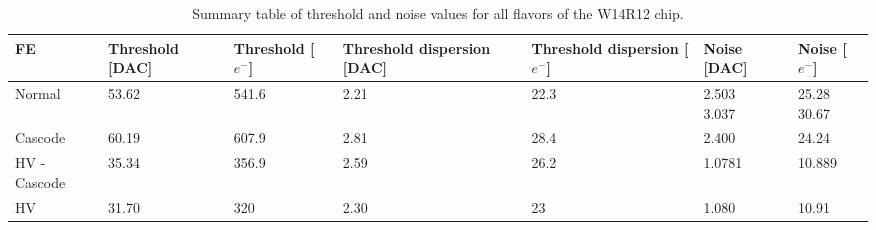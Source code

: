 \begin{comment}
\begin{table}[h!]
\centering
\begin{tabular}{C{1.3cm}|C{1.7cm}|C{1.6cm}|C{1.8cm}|C{1.6cm}|C{1.8cm}|C{1.9cm}}
\hline
FE & Threshold [DAC] & Threshold [$e^{-}$] & Threshold dispersion [DAC] & Threshold dispersion [$e^{-}$] & Noise [DAC] & Noise [$e^{-}$]\\
\hline
\hline
Normal  & 53.62$\pm$0.01 & 541.6$\pm$0.1  & 2.21$\pm$0.01 & 22.3$\pm$0.1 & \shortstack{2.503$\pm$0.005 \\ 3.037$\pm$0.002} & \shortstack{25.28$\pm$0.05 \\ 30.67$\pm$0.02}\\
\hline
Cascode & 60.19$\pm$0.01 & 607.9$\pm$0.1 & 2.81$\pm$0.01 & 28.4$\pm$0.1 & 2.400$\pm$0.003 & 24.24$\pm$0.03\\
\hline
HV - Cascode & 35.34$\pm$0.05 & 356.9$\pm$0.5 & 2.59$\pm$0.05 & 53.4$\pm$0.5 & 1.0781$\pm$0.0003 & 10.889$\pm$0.003\\
\hline
HV & 31.70$\pm$0.10 & 320$\pm$1 & 2.30$\pm$0.10 & 23$\pm$1 & 1.080$\pm$0.033 & 10.91$\pm$0.33\\
\hline
\end{tabular}
\caption{Summary table of threshold and noise values for all flavors of the W14R12 chip.}
\label{tab:th_noise_all}
\end{table}
\end{comment}

\begin{table}[h!]
\centering
\begin{tabular}{C{1.3cm}|C{1.7cm}|C{1.6cm}|C{1.8cm}|C{1.6cm}|C{1.8cm}|C{1.9cm}}
\hline
FE & Threshold [DAC] & Threshold [$e^{-}$] & Threshold dispersion [DAC] & Threshold dispersion [$e^{-}$] & Noise [DAC] & Noise [$e^{-}$]\\
\hline
\hline
Normal  & 53.62 & 541.6  & 2.21 & 22.3 &  & \\
\hline
Cascode & 60.19 & 607.9 & 2.81 & 28.4 & 2.400 & 24.24\\
\hline
HV - Cascode & 35.34 & 356.9 & 2.59 & 26.2 & 1.0781 & 10.889\\
\hline
HV & 31.70 & 320 & 2.30 & 23 & 1.080 & 10.91\\
\hline
\end{tabular}
\caption{Summary table of threshold and noise values for all flavors of the W14R12 chip.}
\label{tab:th_noise_all}
\end{table}

